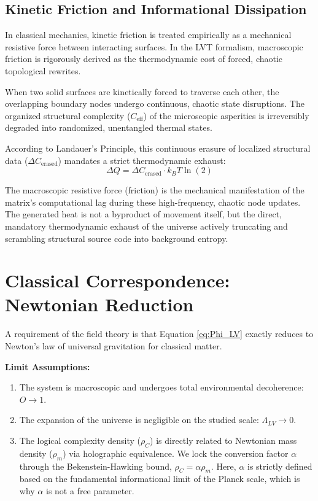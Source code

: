 \documentclass[12pt,a4paper]{article}
\begin{document}
\subsection{Kinetic Friction and Informational Dissipation}
In classical mechanics, kinetic friction is treated empirically as a mechanical resistive force between interacting surfaces. In the LVT formalism, macroscopic friction is rigorously derived as the thermodynamic cost of forced, chaotic topological rewrites.

When two solid surfaces are kinetically forced to traverse each other, the overlapping boundary nodes undergo continuous, chaotic state disruptions. The organized structural complexity ($C_{\mathrm{eff}}$) of the microscopic asperities is irreversibly degraded into randomized, unentangled thermal states. 

According to Landauer's Principle, this continuous erasure of localized structural data ($\Delta C_{\mathrm{erased}}$) mandates a strict thermodynamic exhaust:
\begin{equation}
\Delta Q = \Delta C_{\mathrm{erased}} \cdot k_B T \ln(2)
\end{equation}

The macroscopic resistive force (friction) is the mechanical manifestation of the matrix's computational lag during these high-frequency, chaotic node updates. The generated heat is not a byproduct of movement itself, but the direct, mandatory thermodynamic exhaust of the universe actively truncating and scrambling structural source code into background entropy.





\section{Classical Correspondence: Newtonian Reduction}

A requirement of the field theory is that Equation \ref{eq:Phi_LV} exactly reduces to Newton's law of universal gravitation for classical matter.

\textbf{Limit Assumptions:}
\begin{enumerate}
    \item The system is macroscopic and undergoes total environmental decoherence: $O \to 1$.
    \item The expansion of the universe is negligible on the studied scale: $\Lambda_{LV} \to 0$.
    \item The logical complexity density ($\rho_C$) is directly related to Newtonian mass density ($\rho_m$) via holographic equivalence. We lock the conversion factor $\alpha$ through the Bekenstein-Hawking bound, $\rho_C = \alpha \rho_m$. Here, $\alpha$ is strictly defined based on the fundamental informational limit of the Planck scale, which is why $\alpha$ is not a free parameter.
\end{enumerate}
\end{document}
